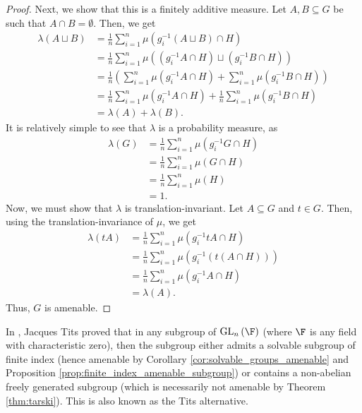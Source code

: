 \begin{proof}
  Next, we show that this is a finitely additive measure. Let $A,B\subseteq G$ be such that $A\cap B = \emptyset$. Then, we get
  \begin{align*}
    \lambda\left(A\sqcup B\right) &= \frac{1}{n}\sum_{i=1}^{n}\mu\left(g_i^{-1}\left(A\sqcup B\right)\cap H\right)\\
                                  &= \frac{1}{n}\sum_{i=1}^{n}\mu\left(\left(g_i^{-1}A\cap H\right)\sqcup \left(g_i^{-1}B\cap H\right)\right)\\
                                  &= \frac{1}{n}\left(\sum_{i=1}^{n}\mu\left(g_i^{-1}A\cap H\right) + \sum_{i=1}^{n}\mu\left(g_i^{-1}B\cap H\right)\right)\\
                                  &= \frac{1}{n}\sum_{i=1}^{n}\mu\left(g_i^{-1}A\cap H\right) + \frac{1}{n}\sum_{i=1}^{n}\mu\left(g_i^{-1}B\cap H\right)\\
                                  &= \lambda\left(A\right) + \lambda\left(B\right).
  \end{align*}
  It is relatively simple to see that $\lambda$ is a probability measure, as
  \begin{align*}
    \lambda\left(G\right) &= \frac{1}{n}\sum_{i=1}^{n}\mu\left(g_i^{-1}G\cap H\right)\\
                          &= \frac{1}{n}\sum_{i=1}^{n}\mu\left(G\cap H\right)\\
                          &= \frac{1}{n}\sum_{i=1}^{n}\mu\left(H\right)\\
                          &= 1.
  \end{align*}
  Now, we must show that $\lambda$ is translation-invariant. Let $A\subseteq G$ and $t\in G$. Then, using the translation-invariance of $\mu$, we get
  \begin{align*}
    \lambda\left(tA\right) &= \frac{1}{n}\sum_{i=1}^{n}\mu\left(g_i^{-1}tA\cap H\right)\\
                           &= \frac{1}{n}\sum_{i=1}^{n}\mu\left(g_i^{-1}\left(t\left(A\cap H\right)\right)\right)\\
                           &= \frac{1}{n}\sum_{i=1}^{n}\mu\left(g_i^{-1}A\cap H\right)\\
                           &= \lambda\left(A\right).
  \end{align*}
  Thus, $G$ is amenable.
\end{proof}
In \cite{free_subgroups_of_linear_groups}, Jacques Tits proved that in any subgroup of $\text{GL}_n\left(\F\right)$ (where $\F$ is any field with characteristic zero), then the subgroup either admits a solvable subgroup of finite index (hence amenable by Corollary \ref{cor:solvable_groups_amenable} and Proposition \ref{prop:finite_index_amenable_subgroup}) or contains a non-abelian freely generated subgroup (which is necessarily not amenable by Theorem \ref{thm:tarski}). This is also known as the Tits alternative.\newline

